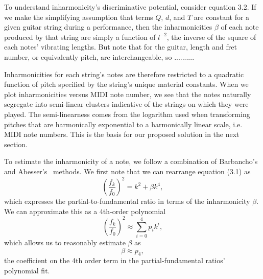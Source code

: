 \documentclass[12pt]{cmuthesis}
\begin{document}
To understand inharmonicity's discriminative potential, consider equation 3.2. If we make the simplifying assumption that terms $Q$, $d$, and $T$ are constant for a given guitar string during a performance, then the inharmonicities $\beta$ of each note produced by that string are simply a function of $l^{-2}$, the inverse of the square of each notes' vibrating lengths. But note that for the guitar, length and fret number, or equivalently pitch, are interchangeable, so .......... 

Inharmonicities for each string's notes are therefore restricted to a quadratic function of pitch specified by the string's unique material constants. When we plot inharmonicities versus MIDI note number, we see that the notes naturally segregate into semi-linear clusters indicative of the strings on which they were played. The semi-linearness comes from the logarithm used when transforming pitches that are harmonically exponential to a harmonically linear scale, i.e. MIDI note numbers. This is the basis for our proposed solution in the next section.

To estimate the inharmonicity of a note, we follow a combination of Barbancho's~\cite{barbanchoi2012} and Abesser's~\cite{abesser2012} methods. We first note that we can rearrange equation (3.1) as
\begin{equation}
(\frac{f_k}{f_0})^2 = k^2 + \beta k^4,
\end{equation}
which expresses the partial-to-fundamental ratio in terms of the inharmonicity $\beta$. We can approximate this as a 4th-order polynomial
\begin{equation}
(\frac{f_k}{f_0})^2 \approx \sum_{i=0}^{4}{p_{i}k^i},
\end{equation}
which allows us to reasonably estimate $\beta$ as
\begin{equation}
\beta \approx p_{4},
\end{equation}
the coefficient on the 4th order term in the partial-fundamental ratios' polynomial fit.
\end{document}
